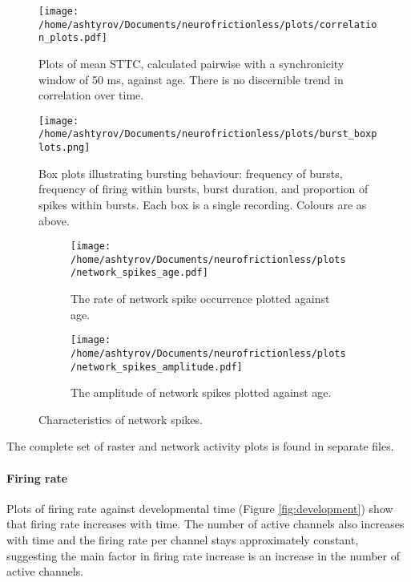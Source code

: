 \documentclass[10pt]{article}
\begin{document}
\begin{figure}
	\centering
	\texttt{[image: /home/ashtyrov/Documents/neurofrictionless/plots/correlation\_plots.pdf]}
	\caption{Plots of mean STTC, calculated pairwise with a synchronicity window of 50 ms, against age. There is no discernible trend in correlation over time.}
	\label{fig:correlation}
\end{figure}

\begin{figure}
	\centering
	\texttt{[image: /home/ashtyrov/Documents/neurofrictionless/plots/burst\_boxplots.png]}
	\caption{Box plots illustrating bursting behaviour: frequency of bursts, frequency of firing within bursts, burst duration, and proportion of spikes within bursts. Each box is a single recording. Colours are as above.}
	\label{fig:burst}
\end{figure}

\begin{figure}
\centering
\begin{subfigure}[b]{0.7\textwidth}
	\centering
	\texttt{[image: /home/ashtyrov/Documents/neurofrictionless/plots/network\_spikes\_age.pdf]}
	\caption{The rate of network spike occurrence plotted against age.}
	\label{fig:networkfreq}
\end{subfigure}

\begin{subfigure}[b]{0.7\textwidth}
	\centering
	\texttt{[image: /home/ashtyrov/Documents/neurofrictionless/plots/network\_spikes\_amplitude.pdf]}
	\caption{The amplitude of network spikes plotted against age.}
	\label{fig:networkamp}
\end{subfigure}
\caption{Characteristics of network spikes.}
\end{figure}

\par The complete set of raster and network activity plots is found in separate files.

\paragraph{Firing rate} Plots of firing rate against developmental time (Figure \ref{fig:development}) show that firing rate increases with time. The number of active channels also increases with time and the firing rate per channel stays approximately constant, suggesting the main factor in firing rate increase is an increase in the number of active channels.
\end{document}
